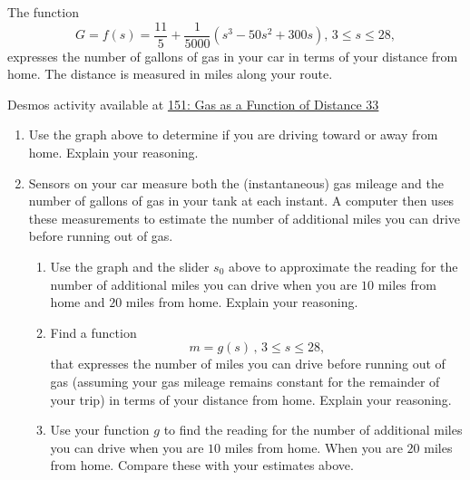 \documentclass{ximera}
\begin{document}
\begin{question} \label{Qjjjkmmmadgt4e}
The function 
\[
   G = f(s) = \frac{11}{5} +\frac{1}{5000}\left( s^3-50s^2+300s \right) , \, 3\leq s \leq 28 ,
\]
expresses the number of gallons of gas in your car in terms of your distance from home. The distance is measured in miles along your route. 

\begin{onlineOnly}
    \begin{center}
\end{center}
\end{onlineOnly}

Desmos activity available at
\href{https://www.desmos.com/calculator/pb8v4t3cxg}{151: Gas as a Function of Distance 33}

\begin{enumerate}
\item Use the graph above to determine if you are driving toward or away from home. Explain your reasoning.

\item Sensors on your car measure both the (instantaneous) gas mileage and the number of gallons of gas in your tank at each instant. A computer then uses these measurements to estimate the number of additional miles you can drive before running out of gas.

\begin{enumerate}

\item Use the graph and the slider $s_0$ above to approximate the reading for the number of additional miles you can drive when you are $10$ miles from home and $20$ miles from home. Explain your reasoning.

\item Find a function 
\[
  m =g(s) \, , \, 3\leq s \leq 28 ,
\]
that expresses the number of miles you can drive before running out of gas (assuming your gas mileage remains constant for the remainder of your trip) in terms of your distance from home. Explain your reasoning. 

\item Use your function $g$ to find the reading for the number of additional miles you can drive when you are $10$ miles from home. When you are $20$ miles from home. Compare these with your estimates above.








\end{enumerate}
\end{enumerate}
\end{question}
\end{document}

